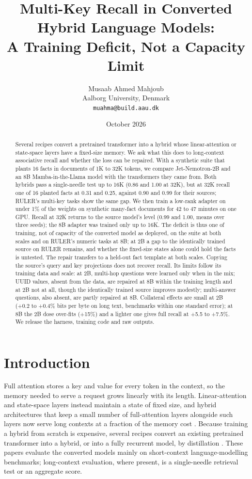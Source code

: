 \documentclass[11pt]{article}
\title{Multi-Key Recall in Converted Hybrid Language Models:\\ A Training Deficit, Not a Capacity Limit}
\author{Musaab Ahmed Mahjoub\\ Aalborg University, Denmark\\ \texttt{muahma@build.aau.dk}}
\date{October 2026}
\begin{document}
\maketitle

\begin{abstract}
Several recipes convert a pretrained transformer into a hybrid whose linear-attention or state-space layers have a fixed-size memory. We ask what this does to long-context associative recall and whether the loss can be repaired. With a synthetic suite that plants 16 facts in documents of 1K to 32K tokens, we compare Jet-Nemotron-2B and an 8B Mamba-in-the-Llama model with the transformers they came from. Both hybrids pass a single-needle test up to 16K (0.86 and 1.00 at 32K), but at 32K recall one of 16 planted facts at 0.31 and 0.25, against 0.90 and 0.99 for their sources; RULER's multi-key tasks show the same gap. We then train a low-rank adapter on under 1\% of the weights on synthetic many-fact documents for 42 to 47 minutes on one GPU. Recall at 32K returns to the source model's level (0.99 and 1.00, means over three seeds); the 8B adapter was trained only up to 16K. The deficit is thus one of training, not of capacity of the converted model as deployed, on the suite at both scales and on RULER's numeric tasks at 8B; at 2B a gap to the identically trained source on RULER remains, and whether the fixed-size states alone could hold the facts is untested. The repair transfers to a held-out fact template at both scales. Copying the source's query and key projections does not recover recall. Its limits follow its training data and scale: at 2B, multi-hop questions were learned only when in the mix; UUID values, absent from the data, are repaired at 8B within the training length and at 2B not at all, though the identically trained source improves modestly; multi-answer questions, also absent, are partly repaired at 8B. Collateral effects are small at 2B (+0.2 to +0.4\% bits per byte on long text, benchmarks within one standard error); at 8B the 2B dose over-fits (+15\%) and a lighter one gives full recall at +5.5 to +7.5\%. We release the harness, training code and raw outputs.
\end{abstract}

\section{Introduction}
Full attention stores a key and value for every token in the context, so the memory needed to serve a request grows linearly with its length. Linear-attention and state-space layers instead maintain a state of fixed size, and hybrid architectures that keep a small number of full-attention layers alongside such layers now serve long contexts at a fraction of the memory cost \citep{jamba2024,samba2024}. Because training a hybrid from scratch is expensive, several recipes convert an existing pretrained transformer into a hybrid, or into a fully recurrent model, by distillation \citep{mambainllama2024,lolcats2024,supra2024,radlads2025,jetnemotron2025}. These papers evaluate the converted models mainly on short-context language-modelling benchmarks; long-context evaluation, where present, is a single-needle retrieval test or an aggregate score.
\end{document}
